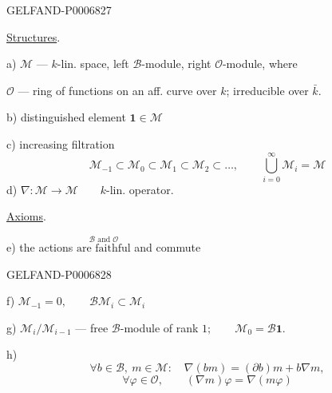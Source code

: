 \begin{GelfandAdjacentEvidence}{GELFAND-P000682}{7}


\underline{Structures}.

a) \(\mathcal M\) --- \(k\)-lin. space, left \(\mathcal B\)-module, right \(\mathcal O\)-module, where

\(\mathcal O\) --- ring of functions on an aff. curve over \(k\); irreducible over \(\bar k\).

b) distinguished element \(\mathbf 1\in\mathcal M\)

c) increasing filtration
\[
\mathcal M_{-1}\subset\mathcal M_0\subset\mathcal M_1\subset\mathcal M_2\subset\ldots,
\qquad\bigcup_{i=0}^\infty\mathcal M_i=\mathcal M
\]
d) \(\nabla:\mathcal M\longrightarrow\mathcal M\qquad k\)-lin. operator.

\underline{Axioms}.

e) the actions \(\overset{\mathcal B\text{ and }\mathcal O}{\text{are faithful}}\) and commute
\end{GelfandAdjacentEvidence}
\begin{GelfandAdjacentEvidence}{GELFAND-P000682}{8}


f) \(\mathcal M_{-1}=0,\qquad \mathcal B\mathcal M_i\subset\mathcal M_i\)

g) \(\mathcal M_i/\mathcal M_{i-1}\) --- free \(\mathcal B\)-module of rank \(1;\qquad \mathcal M_0=\mathcal B\mathbf 1\).

h)
\[
\forall b\in\mathcal B,\ m\in\mathcal M:\quad
\nabla(bm)=(\partial b)m+b\nabla m,
\]
\[
\forall\varphi\in\mathcal O,\qquad
(\nabla m)\varphi=\nabla(m\varphi)
\]
\end{GelfandAdjacentEvidence}



